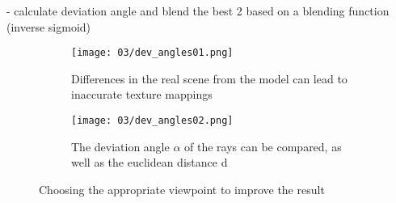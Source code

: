  - calculate deviation angle and blend the best 2 based on a blending function (inverse sigmoid)

\begin{figure}
\centering
    \hfill
    \begin{subfigure}[t]{0.3\textwidth}            
            \centering
            \texttt{[image: 03/dev\_angles01.png]}
            \caption{Differences in the real scene from the model can lead to inaccurate texture mappings}
    \end{subfigure}%
    \hfill
    \begin{subfigure}[t]{0.3\textwidth}
            \centering
            \texttt{[image: 03/dev\_angles02.png]}
            \caption{The deviation angle $\alpha$ of the rays can be compared, as well as the euclidean distance d}
    \end{subfigure}
    \hfill
    \hfill
    \caption[Choosing the appropriate viewpoint for texture lookup]{Choosing the appropriate viewpoint to improve the result} \label{fig:dev_angle}
\end{figure}


